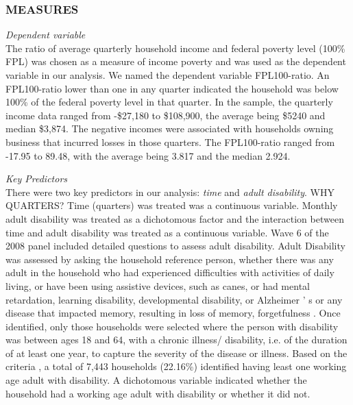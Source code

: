 \documentclass[11pt]{extarticle} %
\begin{document}
\subsubsection*{MEASURES}
\noindent
{\emph{Dependent variable}}\\
The ratio of average quarterly household income and federal poverty level (100\% FPL) was chosen as a measure of income poverty and was used as the dependent variable in our analysis. We named the dependent variable FPL100-ratio. An FPL100-ratio lower than one in any quarter indicated the household was below 100\% of the federal poverty level in that quarter. In the sample, the quarterly income data ranged from -\$27,180 to \$108,900, the average being \$5240 and median \$3,874. The negative incomes were associated with households owning business that incurred losses in those quarters. The FPL100-ratio ranged from -17.95 to 89.48, with the average being 3.817 and the median 2.924. 

\noindent
{\emph{Key Predictors}}\\
There were two key predictors in our analysis: {\emph{time}} and {\emph{adult disability}}. WHY QUARTERS? Time (quarters) was treated was a continuous variable. Monthly  adult disability was treated as a dichotomous factor and the interaction between time and adult disability was treated as a continuous variable. Wave 6 of the 2008 panel included detailed questions to assess adult disability. Adult Disability was assessed by asking the household reference person, whether there was any adult in the household who had experienced difficulties with activities of daily living, or have been using assistive devices, such as canes, or had mental retardation, learning disability, developmental disability, or Alzheimer ’ s or any disease that impacted memory, resulting in loss of memory, forgetfulness . Once identified, only those households were selected where the person with disability was between ages 18 and 64, with a chronic illness/ disability, i.e. of the duration of at least one year, to capture the severity of the disease or illness. Based on the criteria , a total of 7,443 households (22.16\%) identified having least one working age adult with disability. A dichotomous variable indicated whether the household had a working age adult with disability or whether it did not. 
\end{document}
